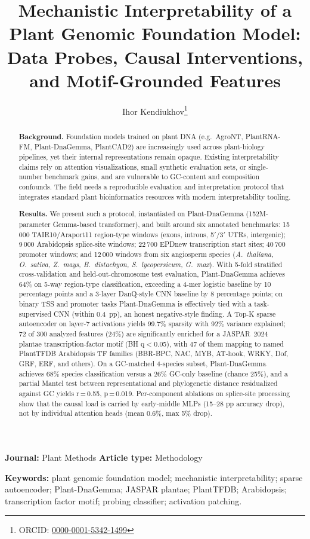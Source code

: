\documentclass[11pt, a4paper]{article}
\title{Mechanistic Interpretability of a Plant Genomic Foundation Model:
       Data Probes, Causal Interventions, and Motif-Grounded Features}
\author[1,$\ast$]{Ihor Kendiukhov\thanks{ORCID: \href{https://orcid.org/0000-0001-5342-1499}{0000-0001-5342-1499}}}
\affil[1]{Department of Computer Science, University of Tübingen, Tübingen, Germany}
\affil[$\ast$]{Correspondence: \texttt{ihor.kendiukhov@student.uni-tuebingen.de}}
\date{}
\begin{document}
\maketitle

\noindent\textbf{Journal:} Plant Methods \quad\textbf{Article type:} Methodology

\vspace{0.6em}
\noindent\textbf{Keywords:} plant genomic foundation model; mechanistic
interpretability; sparse autoencoder; Plant-DnaGemma; JASPAR plantae;
PlantTFDB; Arabidopsis; transcription factor motif; probing classifier;
activation patching.

\begin{abstract}
\noindent\textbf{Background.}
Foundation models trained on plant DNA (e.g.\ AgroNT, PlantRNA-FM,
Plant-DnaGemma, PlantCAD2) are increasingly used across plant-biology
pipelines, yet their internal representations remain opaque. Existing
interpretability claims rely on attention visualizations, small synthetic
evaluation sets, or single-number benchmark gains, and are vulnerable to
GC-content and composition confounds. The field needs a reproducible
evaluation and interpretation protocol that integrates standard plant
bioinformatics resources with modern interpretability tooling.

\vspace{0.4em}
\noindent\textbf{Results.}
We present such a protocol, instantiated on Plant-DnaGemma (152M-parameter
Gemma-based transformer), and built around six annotated benchmarks:
15\,000 TAIR10/Araport11 region-type windows (exons, introns, 5$'$/3$'$
UTRs, intergenic); 9\,000 Arabidopsis splice-site windows; 22\,700 EPDnew
transcription start sites; 40\,700 promoter windows; and 12\,000 windows
from six angiosperm species (\textit{A.~thaliana, O.~sativa, Z.~mays,
B.~distachyon, S.~lycopersicum, G.~max}). With 5-fold stratified
cross-validation and held-out-chromosome test evaluation, Plant-DnaGemma
achieves 64\% on 5-way region-type classification, exceeding a 4-mer
logistic baseline by 10 percentage points and a 3-layer DanQ-style CNN
baseline by 8 percentage points; on binary TSS and promoter tasks
Plant-DnaGemma is effectively tied with a task-supervised CNN
(within 0.4~pp), an honest negative-style finding. A Top-K sparse
autoencoder on layer-7 activations yields 99.7\% sparsity with 92\%
variance explained; 72 of 300 analyzed features (24\%) are significantly
enriched for a JASPAR~2024 plantae transcription-factor motif (BH
q$<$0.05), with 47 of them mapping to named PlantTFDB Arabidopsis TF
families (BBR-BPC, NAC, MYB, AT-hook, WRKY, Dof, GRF, ERF, and others). On
a GC-matched 4-species subset, Plant-DnaGemma achieves 68\% species
classification versus a 26\% GC-only baseline (chance 25\%), and a partial
Mantel test between representational and phylogenetic distance residualized
against GC yields r\,=\,0.55, p\,=\,0.019. Per-component ablations on
splice-site processing show that the causal load is carried by early-middle
MLPs (15--28 pp accuracy drop), not by individual attention heads (mean
0.6\%, max 5\% drop).


\end{abstract}
\end{document}

